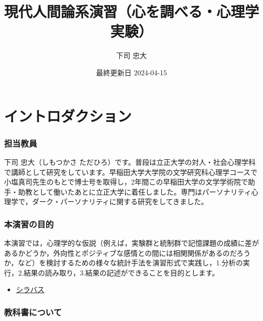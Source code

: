 \documentclass[
]{book}
\title{現代人間論系演習（心を調べる・心理学実験）}
\author{下司 忠大}
\date{最終更新日 2024-04-15}
\providecommand{\tightlist}{%
  \setlength{\itemsep}{0pt}\setlength{\parskip}{0pt}}
\theoremstyle{definition}
\theoremstyle{definition}
\theoremstyle{definition}
\theoremstyle{definition}
\theoremstyle{remark}
\begin{document}
\maketitle

{
\setcounter{tocdepth}{1}
\tableofcontents
}
\hypertarget{ux30a4ux30f3ux30c8ux30edux30c0ux30afux30b7ux30e7ux30f3}{%
\chapter*{イントロダクション}\label{ux30a4ux30f3ux30c8ux30edux30c0ux30afux30b7ux30e7ux30f3}}

\hypertarget{ux62c5ux5f53ux6559ux54e1}{%
\subsection*{担当教員}\label{ux62c5ux5f53ux6559ux54e1}}

下司 忠大（しもつかさ ただひろ）です。普段は立正大学の対人・社会心理学科で講師として研究をしています。早稲田大学大学院の文学研究科心理学コースで小塩真司先生のもとで博士号を取得し，2年間この早稲田大学の文学学術院で助手・助教として働いたあとに立正大学に着任しました。専門はパーソナリティ心理学で，ダーク・パーソナリティに関する研究をしてきました。

\hypertarget{ux672cux6f14ux7fd2ux306eux76eeux7684}{%
\subsection*{本演習の目的}\label{ux672cux6f14ux7fd2ux306eux76eeux7684}}

本演習では，心理学的な仮説（例えば，実験群と統制群で記憶課題の成績に差があるかどうか，外向性とポジティブな感情との間には相関関係があるのだろうか，など）を検討するための様々な統計手法を演習形式で実践し，1.分析の実行，2.結果の読み取り，3.結果の記述ができることを目的とします。

\begin{itemize}
\tightlist
\item
  \href{https://www.dropbox.com/scl/fi/lu04wj6y6mjsht88sg20g/.pdf?rlkey=ng2r14napi2n2tz4wedm1eum7\&dl=0}{シラバス}
\end{itemize}

\hypertarget{ux6559ux79d1ux66f8ux306bux3064ux3044ux3066}{%
\subsection*{教科書について}\label{ux6559ux79d1ux66f8ux306bux3064ux3044ux3066}}
\end{document}
